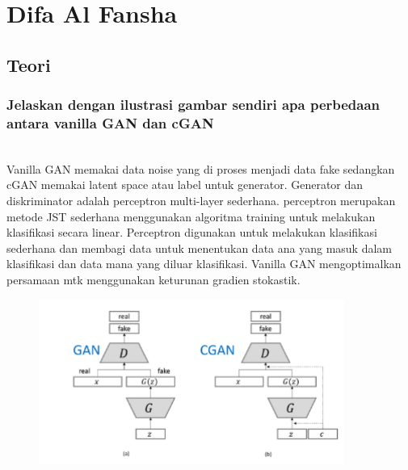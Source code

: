 \section{Difa Al Fansha}

\subsection{Teori}
	\subsubsection{Jelaskan dengan ilustrasi gambar sendiri apa perbedaan antara vanilla GAN dan cGAN}
	\hfill\\
	Vanilla GAN memakai data noise yang di proses menjadi data fake sedangkan cGAN memakai latent space atau label untuk generator.
	Generator dan diskriminator adalah perceptron multi-layer sederhana. perceptron merupakan metode JST sederhana menggunakan algoritma training untuk melakukan klasifikasi secara linear.
	Perceptron digunakan untuk melakukan klasifikasi sederhana dan membagi data untuk menentukan data ana yang masuk dalam klasifikasi dan data mana yang diluar klasifikasi.
	Vanilla GAN mengoptimalkan persamaan mtk menggunakan keturunan gradien stokastik.
	
	\begin{figure}[H]
		\begin{center}
		 \includegraphics[width=10cm]{figures/1174076/figures9/teori1.png}
		 \caption{}	
		\end{center}
	\end{figure}

